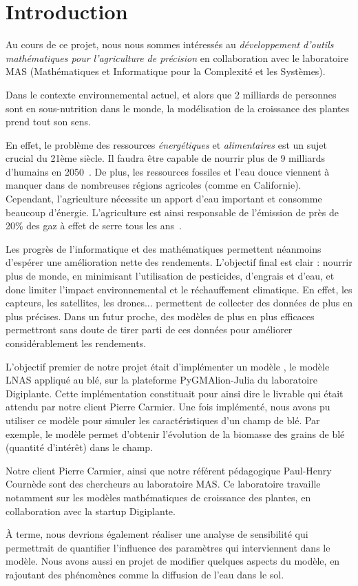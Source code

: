 \section{Introduction}


Au cours de ce projet, nous nous sommes intéressés au \emph{développement d'outils mathématiques 
pour l'agriculture de précision} en collaboration avec le laboratoire MAS (Mathématiques et Informatique pour la Complexité et les Systèmes).

Dans le contexte environnemental actuel, et alors que 2 milliards de personnes sont en sous-nutrition dans le monde, la modélisation de la croissance des plantes prend tout son sens.

En effet, le problème des ressources \textit{énergétiques} et \textit{alimentaires} est un sujet crucial du  21ème siècle.
Il faudra être capable de nourrir plus de 
9 milliards d'humains en 2050~\cite{wiki:popu_mondiale}.
De plus, les ressources fossiles et l'eau douce viennent à manquer dans de nombreuses régions agricoles (comme en Californie). Cependant, l'agriculture nécessite un apport d'eau important et consomme beaucoup d'énergie. L'agriculture est ainsi responsable de l'émission de près de 20\% des gaz à effet de serre tous les ans~\cite{GES}.

Les progrès de l'informatique et des mathématiques permettent néanmoins d'espérer une amélioration nette des rendements. L'objectif final est clair : nourrir plus de monde, en minimisant l'utilisation de pesticides, d'engrais et d'eau, et donc limiter l'impact environnemental et le réchauffement climatique. En effet, les capteurs, les satellites, les drones... permettent de collecter des données de plus en plus précises. Dans un futur proche, des modèles de plus en plus efficaces permettront sans doute de tirer parti de ces données pour améliorer considérablement les rendements.  

L'objectif premier de notre projet était d'implémenter un modèle , le modèle LNAS appliqué au blé, sur la plateforme PyGMAlion-Julia du laboratoire Digiplante. Cette implémentation constituait pour ainsi dire le livrable qui était attendu par notre client Pierre Carmier.
Une fois implémenté, nous avons pu utiliser ce modèle pour simuler les caractéristiques d'un champ de blé. Par exemple, le modèle permet d'obtenir l'évolution de la biomasse des grains de blé (quantité d'intérêt) dans le champ.

Notre client Pierre Carmier, ainsi que notre référent pédagogique Paul-Henry Cournède sont des chercheurs au laboratoire MAS.
Ce laboratoire travaille notamment sur les modèles mathématiques de
croissance des plantes, en collaboration avec la startup Digiplante.

À terme, nous devrions également réaliser une analyse de sensibilité qui permettrait de quantifier l'influence des paramètres qui interviennent dans le modèle. Nous avons aussi en projet de modifier quelques aspects du modèle, en rajoutant des phénomènes comme la diffusion de l'eau dans le sol.